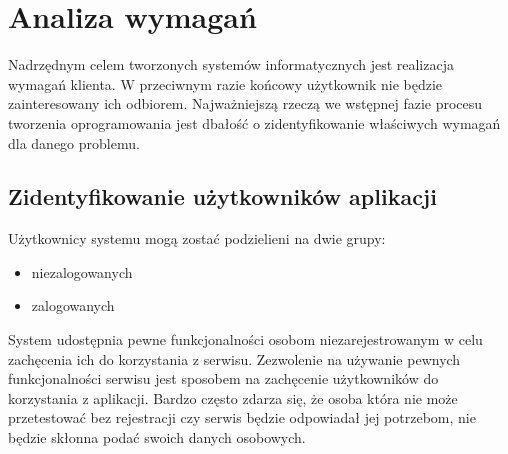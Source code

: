 \chapter{Analiza wymagań}
\label{cha:inzyneriaWymagan}
Nadrzędnym celem tworzonych systemów informatycznych jest realizacja wymagań klienta. W przeciwnym razie końcowy użytkownik nie będzie zainteresowany ich odbiorem. Najważniejszą rzeczą we wstępnej fazie procesu tworzenia oprogramowania jest dbałość o zidentyfikowanie właściwych wymagań dla danego problemu.

\section{Zidentyfikowanie użytkowników aplikacji}
\label{sec:uzytkownicy}
Użytkownicy systemu mogą zostać podzielieni na dwie grupy:
\begin{itemize}
\item niezalogowanych
\item zalogowanych
\end{itemize}
System udostępnia pewne funkcjonalności osobom niezarejestrowanym w celu zachęcenia ich do korzystania z serwisu. Zezwolenie na używanie pewnych funkcjonalności serwisu jest sposobem na zachęcenie użytkowników do korzystania z aplikacji. Bardzo często zdarza się, że osoba która nie może przetestować bez rejestracji czy serwis będzie odpowiadał jej potrzebom, nie będzie skłonna podać swoich danych osobowych.

